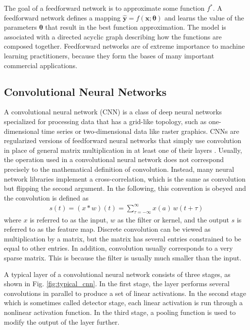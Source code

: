 \documentclass{scrartcl}
\begin{document}
The goal of a feedforward network is to approximate some function $f^*$. A feedforward network defines a mapping $\hat{\mathbf y} = f(\mathbf x; \boldsymbol \theta)$ and learns the value of the parameters $\boldsymbol \theta$ that result in the best function approximation. The model is associated with a directed acyclic graph describing how the functions are composed together. Feedforward networks are of extreme importance to machine learning practitioners, because they form the bases of many important commercial applications. 

\subsection{Convolutional Neural Networks}

A convolutional neural network (CNN) \cite{LeCun1989} is a class of deep neural networks specialized for processing data that has a grid-like topology, such as one-dimensional time series or two-dimensional data like raster graphics. CNNs are regularized versions of feedforward neural networks that simply use convolution in place of general matrix multiplication in at least one of their layers \cite{Goodfellow2016}. Usually, the operation used in a convolutional neural network does not correspond precisely to the mathematical definition of convolution. Instead, many neural network libraries implement a cross-correlation, which is the same as convolution but flipping the second argument. In the following, this convention is obeyed and the convolution is defined as
\begin{align}
s(t) = (x * w)(t) = \sum_{\tau=-\infty}^{\infty} x(a)\,w(t+\tau)
\end{align} 
where $x$ is referred to as the input, $w$ as the filter or kernel, and the output $s$ is referred to as the feature map. Discrete convolution can be viewed as multiplication by a matrix, but the matrix has several entries constrained to be equal to other entries. In addition, convolution usually corresponds to a very sparse matrix. This is because the filter is usually much smaller than the input. 

A typical layer of a convolutional neural network consists of three stages, as shown in Fig. \ref{fig:typical_cnn}. In the first stage, the layer performs several convolutions in parallel to produce a set of linear activations. In the second stage which is sometimes called detector stage, each linear activation is run through a nonlinear activation function. In the third stage, a pooling function is used to modify the output of the layer further. 
\end{document}
